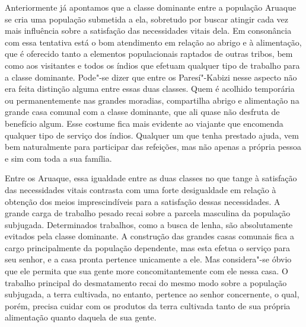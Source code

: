 Anteriormente já apontamos que a classe dominante entre a população
Aruaque se cria uma população submetida a ela, sobretudo por buscar
atingir cada vez mais influência sobre a satisfação das necessidades
vitais dela. Em consonância com essa tentativa está o bom atendimento em
relação ao abrigo e à alimentação, que é oferecido tanto a elementos
populacionais raptados de outras tribos, bem como aos visitantes e todos
os índios que efetuam qualquer tipo de trabalho para a classe dominante.
Pode"-se dizer que entre os Paresí"-Kabizi nesse aspecto não era feita
distinção alguma entre essas duas classes. Quem é acolhido temporária ou
permanentemente nas grandes moradias, compartilha abrigo e alimentação
na grande casa comunal com a classe dominante, que ali quase não
desfruta de benefício algum. Esse costume fica mais evidente ao viajante
que encomenda qualquer tipo de serviço dos índios. Qualquer um que tenha
prestado ajuda, vem bem naturalmente para participar das refeições, mas
não apenas a própria pessoa e sim com toda a sua família.

Entre os Aruaque, essa igualdade entre as duas classes no que tange à
satisfação das necessidades vitais contrasta com uma forte desigualdade
em relação à obtenção dos meios imprescindíveis para a satisfação
dessas necessidades. A grande carga de trabalho pesado recai sobre a
parcela masculina da população subjugada. Determinados trabalhos, como a
busca de lenha, são absolutamente evitados pela classe dominante. A
construção das grandes casas comunais fica a cargo principalmente da
população dependente, mas esta efetua o serviço para seu senhor, e a
casa pronta pertence unicamente a ele. Mas considera"-se óbvio que ele
permita que sua gente more concomitantemente com ele nessa casa. O
trabalho principal do desmatamento recai do mesmo modo sobre a
população subjugada, a terra cultivada, no entanto, pertence ao senhor
concernente, o qual, porém, precisa cuidar com os produtos da terra
cultivada tanto de sua própria alimentação quanto daquela de sua gente.

